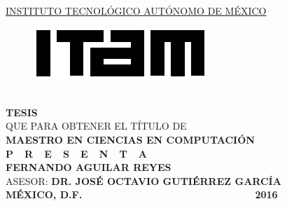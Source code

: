 \begin{titlepage}
\begin{center}

\textsc{\underline{INSTITUTO TECNOLÓGICO AUTÓNOMO DE MÉXICO}}\\[1.5cm] %

\begin{figure}[h]
\centering
\includegraphics[scale=2]{imagenes/logoitam.png}\\[0.5cm] %
\end{figure} 

\huge{\thesisTitle}\\[1.5cm] %


\large \textbf{TESIS}\\ QUE PARA OBTENER EL TÍTULO DE\\ \textbf{MAESTRO EN CIENCIAS EN COMPUTACIÓN}\\[0.8cm]
\large \textbf{P\ \  R\ \  E\ \  S\ \  E\ \  N\ \  T\ \  A}\\[0.8cm]

\textbf{FERNANDO AGUILAR REYES}\\[1.0cm]

\large ASESOR: \textbf{DR. JOSÉ OCTAVIO GUTIÉRREZ GARCÍA}\\[1.4cm]

\large \textbf{MÉXICO, D.F.} {\ \ \ \ \ \ \ \ \ \ \ \ \ \ \ \ \ \ \ \ \ \ \ \ \ \ \ \ \ \ \ \ \ \ } \textbf{2016}

\vfill
\end{center}

\end{titlepage}
